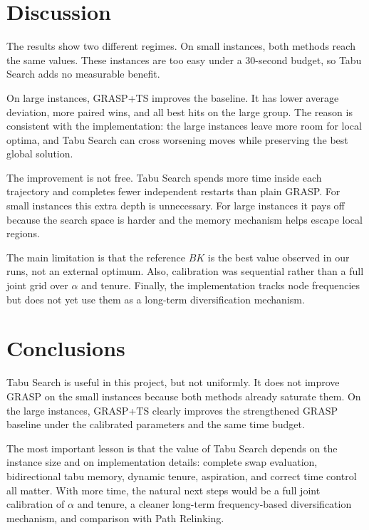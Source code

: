 \documentclass[12pt,a4paper]{article}
\newcommand{\grasp}{GRASP}
\newcommand{\graspTS}{GRASP+TS}
\newcommand{\tabu}{Tabu Search}
\begin{document}
\section{Discussion}

The results show two different regimes. On small instances, both methods reach the same values. These instances are too easy under a 30-second budget, so \tabu{} adds no measurable benefit.

On large instances, \graspTS{} improves the baseline. It has lower average deviation, more paired wins, and all best hits on the large group. The reason is consistent with the implementation: the large instances leave more room for local optima, and \tabu{} can cross worsening moves while preserving the best global solution.

The improvement is not free. \tabu{} spends more time inside each trajectory and completes fewer independent restarts than plain \grasp{}. For small instances this extra depth is unnecessary. For large instances it pays off because the search space is harder and the memory mechanism helps escape local regions.

The main limitation is that the reference \(BK\) is the best value observed in our runs, not an external optimum. Also, calibration was sequential rather than a full joint grid over \(\alpha\) and tenure. Finally, the implementation tracks node frequencies but does not yet use them as a long-term diversification mechanism.

\section{Conclusions}

\tabu{} is useful in this project, but not uniformly. It does not improve \grasp{} on the small instances because both methods already saturate them. On the large instances, \graspTS{} clearly improves the strengthened \grasp{} baseline under the calibrated parameters and the same time budget.

The most important lesson is that the value of \tabu{} depends on the instance size and on implementation details: complete swap evaluation, bidirectional tabu memory, dynamic tenure, aspiration, and correct time control all matter. With more time, the natural next steps would be a full joint calibration of \(\alpha\) and tenure, a cleaner long-term frequency-based diversification mechanism, and comparison with Path Relinking.
\end{document}
